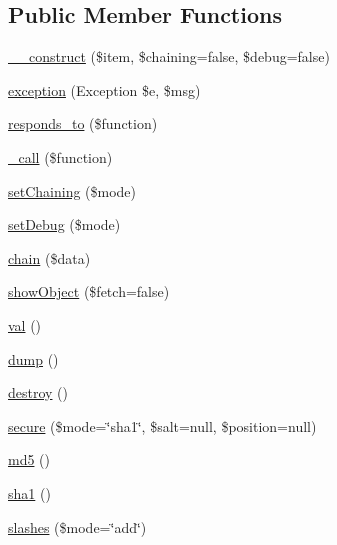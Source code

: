 \subsection*{Public Member Functions}
\begin{DoxyCompactItemize}
\item 
\hyperlink{class_pierce_moore_1_1_ruby_p_h_p_1_1r_ace43a70b24f8e70599b0cc62620f9499}{\-\_\-\-\_\-construct} (\$item, \$chaining=false, \$debug=false)
\item 
\hyperlink{class_pierce_moore_1_1_ruby_p_h_p_1_1r_ac53bb6cc3dad129127779798eb479903}{exception} (Exception \$e, \$msg)
\item 
\hyperlink{class_pierce_moore_1_1_ruby_p_h_p_1_1r_ae9afa34c455aa79da5394a608f38386e}{responds\-\_\-to} (\$function)
\item 
\hyperlink{class_pierce_moore_1_1_ruby_p_h_p_1_1r_af4b09312c3dd2b7ef02781c54c9a5244}{\-\_\-call} (\$function)
\item 
\hyperlink{class_pierce_moore_1_1_ruby_p_h_p_1_1r_a44475d97f032201263e0d481271b9882}{set\-Chaining} (\$mode)
\item 
\hyperlink{class_pierce_moore_1_1_ruby_p_h_p_1_1r_a3a01c4bf259b32b45ac96f980f50776b}{set\-Debug} (\$mode)
\item 
\hyperlink{class_pierce_moore_1_1_ruby_p_h_p_1_1r_afb92656ab6eed3bbf9abb7b75498e2e1}{chain} (\$data)
\item 
\hyperlink{class_pierce_moore_1_1_ruby_p_h_p_1_1r_a979fd6f54086be01e4bdb059b26cec66}{show\-Object} (\$fetch=false)
\item 
\hyperlink{class_pierce_moore_1_1_ruby_p_h_p_1_1r_af745c1e6bc71ed38a120043c0cb13416}{val} ()
\item 
\hyperlink{class_pierce_moore_1_1_ruby_p_h_p_1_1r_a5bf63e4ac70cfd9d97e3f2eab936ec8b}{dump} ()
\item 
\hyperlink{class_pierce_moore_1_1_ruby_p_h_p_1_1r_aa118461de946085fe42989193337044a}{destroy} ()
\item 
\hyperlink{class_pierce_moore_1_1_ruby_p_h_p_1_1r_a983a9fa784e9028dea46897a760f1210}{secure} (\$mode=\char`\"{}sha1\char`\"{}, \$salt=null, \$position=null)
\item 
\hyperlink{class_pierce_moore_1_1_ruby_p_h_p_1_1r_a63b637e71bf8bbee33889ae833423560}{md5} ()
\item 
\hyperlink{class_pierce_moore_1_1_ruby_p_h_p_1_1r_a7751a3691d09eba1c3d390fdde2c4f4f}{sha1} ()
\item 
\hyperlink{class_pierce_moore_1_1_ruby_p_h_p_1_1r_aee99d6b6d0c3479c48a98e76de963e06}{slashes} (\$mode=\char`\"{}add\char`\"{})

\end{DoxyCompactItemize}
